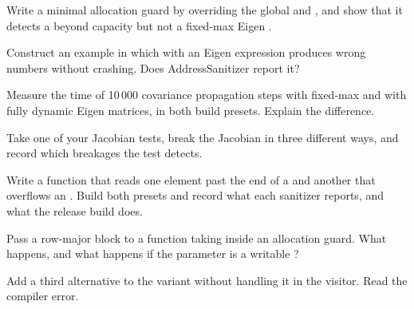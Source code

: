 \begin{exercises}
  \item Write a minimal allocation guard by overriding the global  and , and show that it detects a
         beyond capacity but not a fixed-max Eigen .
  \item Construct an example in which  with an Eigen expression produces wrong numbers without crashing. Does
        AddressSanitizer report it?
  \item Measure the time of 10\,000 covariance propagation steps with fixed-max and with fully dynamic Eigen matrices, in both build
        presets. Explain the difference.
  \item Take one of your Jacobian tests, break the Jacobian in three different ways, and record which breakages the test detects.
  \item Write a function that reads one element past the end of a  and another that overflows an . Build both presets and
        record what each sanitizer reports, and what the release build does.
  \item Pass a row-major block to a function taking  inside an allocation guard. What happens, and what
        happens if the parameter is a writable ?
  \item Add a third alternative to the  variant without handling it in the  visitor. Read the compiler error.
\end{exercises}

\fussy
